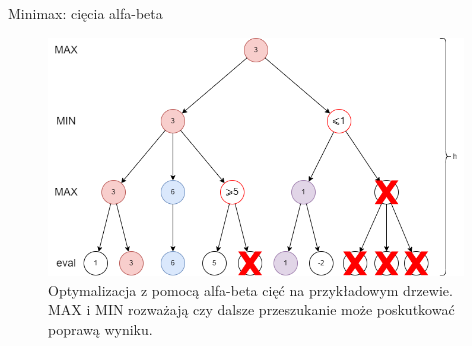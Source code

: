 \begin{frame}[noframenumbering]{Minimax: cięcia alfa-beta}

    \begin{figure}
		\centering
		\includegraphics[width=11cm]{figures/minimax_alfa-beta.png}
		\caption{Optymalizacja z pomocą alfa-beta cięć na przykładowym drzewie. MAX i MIN rozważają czy dalsze przeszukanie może poskutkować poprawą wyniku.}
	\end{figure}

\end{frame}
